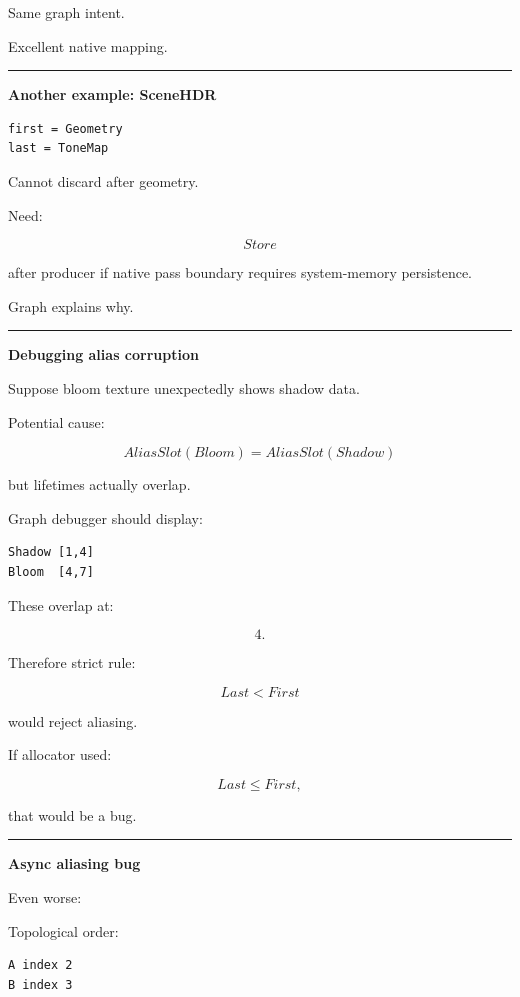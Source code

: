 Same graph intent.

Excellent native mapping.

\begin{center}\rule{0.5\linewidth}{0.5pt}\end{center}

\textbf{Another example: SceneHDR}

\begin{verbatim}
first = Geometry
last = ToneMap
\end{verbatim}

Cannot discard after geometry.

Need:

\[
Store
\]

after producer if native pass boundary requires system-memory persistence.

Graph explains why.

\begin{center}\rule{0.5\linewidth}{0.5pt}\end{center}

\textbf{Debugging alias corruption}

Suppose bloom texture unexpectedly shows shadow data.

Potential cause:

\[
AliasSlot(Bloom)
=
AliasSlot(Shadow)
\]

but lifetimes actually overlap.

Graph debugger should display:

\begin{verbatim}
Shadow [1,4]
Bloom  [4,7]
\end{verbatim}

These overlap at:

\[
4.
\]

Therefore strict rule:

\[
Last<First
\]

would reject aliasing.

If allocator used:

\[
Last\le First,
\]

that would be a bug.

\begin{center}\rule{0.5\linewidth}{0.5pt}\end{center}

\textbf{Async aliasing bug}

Even worse:

Topological order:

\begin{verbatim}
A index 2
B index 3
\end{verbatim}

